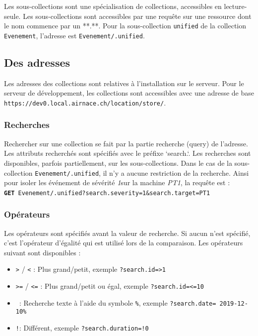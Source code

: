 \documentclass[a4paper,twoside]{article}
\newcommand{\verbe}[1]{\texttt{\textbf{#1}}}
\newcommand{\adresse}[1]{\texttt{#1}}
\newcommand{\requete}[2]{\verbe{#1}~\adresse{#2}}
\newcommand{\collection}[1]{\colorbox{light-gray}{\texttt{#1}}}
\begin{document}
Les sous-collections sont une spécialisation de collections, accessibles en lecture-seule. Les sous-collections sont accessibles par une requête sur une ressource dont le nom commence par un **.**. Pour la sous-collection \collection{unified} de la collection \collection{Evenement}, l'adresse est \adresse{Evenement/.unified}.

\subsection{Des adresses}

Les adresses des collections sont relatives à l'installation sur le serveur. Pour le serveur de développement, les collections sont accessibles avec une adresse de base \adresse{https://dev0.local.airnace.ch/location/store/}.

\subsubsection{Recherches}

Rechercher sur une collection se fait par la partie recherche (query) de l'adresse. Les attributs recherchés sont spécifiés avec le préfixe `search.`. Les recherches sont disponibles, parfois partiellement, sur les sous-collections. Dans le cas de la sous-collection \adresse{Evenement/.unified}, il n'y a aucune restriction de la recherche. Ainsi pour isoler les événement de sévérité {\em 1}sur la machine {\em PT1}, la requête est : \requete{GET}{Evenement/.unified?search.severity=1\&search.target=PT1}

\subsubsection{Opérateurs}

Les opérateurs sont spécifiés avant la valeur de recherche. Si aucun n'est spécifié, c'est l'opérateur d'égalité qui est utilisé lors de la comparaison. Les opérateurs suivant sont disponibles :

\begin{itemize}
  \item \texttt{>} / \texttt{<} : Plus grand/petit, exemple \texttt{?search.id=>1}
  \item \texttt{>=} / \texttt{<=} : Plus grand/petit ou égal, exemple \texttt{?search.id=<=10}
  \item \texttt{~}: Recherche texte à l'aide du symbole \texttt{\%}, exemple \texttt{?search.date=~2019-12-10\%}
  \item \texttt{!}: Différent, exemple \texttt{?search.duration=!0}
\end{itemize}
  
\end{document}
